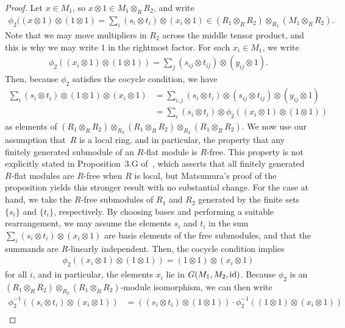 \begin{proof}
Let $x \in M_1$, so $x \otimes 1 \in M_1 \otimes_{R} R_2$, and write
\begin{gather*} \phi_2((x \otimes 1) \otimes (1 \otimes 1) = \sum_i (s_i \otimes t_i) \otimes (x_i \otimes 1) \in (R_1 \otimes_{R} R_2) \otimes_{R_2} (M_1 \otimes_{R} R_2). \end{gather*}
Note that we may move multipliers in $R_2$ across the middle tensor product, and this is why we may write $1$ in the rightmost factor. For each $x_i \in M_1$, we write
\begin{gather*} \phi_2((x_i \otimes 1) \otimes (1 \otimes 1)) = \sum_j (s_{ij} \otimes t_{ij}) \otimes (y_{ij} \otimes 1). \end{gather*}
Then, because $\phi_2$ satisfies the cocycle condition, we have
 \begin{align*} \sum_i (s_i \otimes t_i) \otimes (1 \otimes 1) \otimes (x_i \otimes 1) &= \sum_{i,j} (s_i \otimes t_i) \otimes (s_{ij} \otimes t_{ij}) \otimes (y_{ij} \otimes 1) \\
&= \sum_i (s_i \otimes t_i) \otimes \phi_2((x_i \otimes 1) \otimes (1 \otimes 1))
\end{align*}
as elements of $(R_1 \otimes_{R} R_2) \otimes_{R_2}(R_1 \otimes_{R} R_2) \otimes_{R_2}(R_1 \otimes_{R} R_2)$. We now use our assumption that~$R$ is a local ring, and in particular, the property that any finitely generated submodule of an $R$-flat module is $R$-free. This property is not explicitly stated in Proposition~3.G of~\cite{M80}, which asserts that all finitely generated $R$-flat modules are $R$-free when $R$ is local, but Matsumura's proof of the proposition yields this stronger result with no substantial change. For the case at hand, we take the $R$-free submodules of $R_1$ and $R_2$ generated by the finite sets $\{ s_i\}$ and $\{t_i\}$, respectively. By choosing bases and performing a suitable rearrangement, we may assume the elements $s_i$ and $t_i$ in the sum $\sum_i (s_i \otimes t_i) \otimes (x_i \otimes 1)$ are basis elements of the free submodules, and that the summands are $R$-linearly independent. Then, the cocycle condition implies
\begin{gather*} \phi_2((x_i \otimes 1) \otimes (1 \otimes 1)) = (1 \otimes 1) \otimes (x_i \otimes 1) \end{gather*}
for all $i$, and in particular, the elements $x_i$ lie in $G(M_1,M_2,{\rm id})$. Because $\phi_2$ is an $(R_1 \otimes_{R} R_2) \otimes_{R_2} (R_1 \otimes_{R} R_2)$-module isomorphism, we can then write
\begin{align*}
\phi_2^{-1}((s_i \otimes t_i) \otimes (x_i \otimes 1)) &= ((s_i \otimes t_i) \otimes (1 \otimes 1))\cdot \phi_2^{-1}((1 \otimes 1) \otimes (x_i \otimes 1)) \\

\end{align*}
\end{proof}
